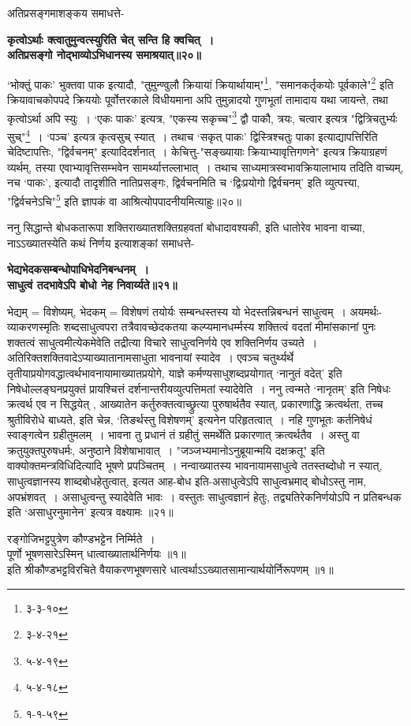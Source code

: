 {{ अतिप्रसङ्गमाशङ्कय समाधत्ते-
\begin{center}
{\bfseries कृत्वोऽर्थाः क्त्वातुमुन्वत्स्युरिति चेत् सन्ति हि क्वचित्~।\\ अतिप्रसङ्गो नोद्भाव्योऽभिधानस्य समाश्रयात्॥२०॥}
\end{center}
 `भोक्तुं पाकः' भुक्तवा पाक इत्यादौ, "तुमुन्ण्वुलौ क्रियायां क्रियार्थायाम्"\footnote{३-३-१०}, "समानकर्तृकयोः पूर्वकाले"\footnote{३-४-२१} इति क्रियावाचकोपपदे क्रिययोः पूर्वोत्तरकाले विधीयमाना अपि तुमुन्नादयो गुणभूतां तामादाय यथा जायन्ते, तथा कृत्वोऽर्था अपि स्युः~।
`एकः पाकः' इत्यत्र, "एकस्य सकृच्च"\footnote{५-४-१९} द्वौ पाकौ, त्रयः, चत्वार इत्यत्र "द्वित्रिचतुर्भ्यः सुच्"\footnote{५-४-१८}~।
`पञ्च' इत्यत्र कृत्वसुच् स्यात्~।
तथाच `सकृत् पाकः' द्विस्त्रिश्चतुः पाका इत्याद्यापत्तिरिति चेदिष्टापत्तिः, "द्विर्वचनम्" इत्यादिदर्शनात्~।
 केचित्तु-"सङ्ख्यायाः क्रियाभ्यावृत्तिगणने" इत्यत्र क्रियाग्रहणं व्यर्थम्, तस्या एवाभ्यावृत्तिसम्भवेन सामर्थ्यात्तल्लाभात्~।
तथाच साध्यमात्रस्वभावक्रियालाभाय तदिति वाच्यम्, नच `पाकः', इत्यादौ तादृशीति नातिप्रसङ्गः, द्विर्वचनमिति च `द्विःप्रयोगो द्विर्वचनम्' इति व्युत्पत्त्या, "द्विर्वचनेऽचि"\footnote{१-१-५९} इति ज्ञापकं वा आश्रित्योपपादनीयमित्याहुः॥२०॥\par
 ननु सिद्धान्ते बोधकतारूपा शक्तिराख्यातशक्तिग्रहवतां बोधादावश्यकी, इति धातोरेव भावना वाच्या, नाऽऽख्यातस्येति कथं निर्णय इत्याशङ्कां समाधत्ते-
\begin{center}{\bfseries भेद्यभेदकसम्बन्धोपाधिभेदनिबन्धनम्~।\\
 साधुत्वं तदभावेऽपि बोधो नेह निवार्य्यते॥२१॥}
\end{center} 
 भेद्यम् = विशेष्यम्, भेदकम् = विशेषणं तयोर्यः सम्बन्धस्तस्य यो भेदस्तन्निबन्धनं साधुत्वम्~।
अयमर्थः- व्याकरणस्मृतिः शब्दसाधुत्वपरा तत्रैवावच्छेदकतया कल्प्यमानधर्म्मस्य शक्तित्वं वदतां मीमांसकानां पुनः शक्तत्वं साधुत्वमीत्येकमेवेति तद्रीत्या विचारे साधुत्वनिर्णये एव शक्तिनिर्णय उच्यते~।
 अतिरिक्तशक्तिवादेऽप्याख्यातानामसाधुता भावनायां स्यादेव~।
एवञ्च चतुर्थ्यर्थे तृतीयाप्रयोगवद्धात्वर्थभावनायामाख्यातप्रयोगे, याज्ञे कर्मण्यसाधुशब्दप्रयोगात् `नानुतं वदेत्' इति निषेधोल्लङ्घनप्रयुक्तं प्रायश्चित्तं दर्शनान्तरीयव्युत्पत्तिमतां स्यादेवेति~।
 ननु त्वन्मते `नानृतम्' इति निषेधः क्रत्वर्थ एव न सिद्धयेत् , आख्यातेन कर्तुरुक्तत्वाच्छ्रुत्या पुरुषार्थतैव स्यात्, प्रकारणाद्धि क्रत्वर्थता, तच्च श्रुतीविरोधे बाध्यते, इति चेन्न, `तिङर्थस्तु विशेषणम्' इत्यनेन परिहृतत्वात्~।
नहि गुणभूतः कर्तनिषेधं स्वाङ्गत्वेन ग्रहीतुमलम्~।
भावना तु प्रधानं तं ग्रहीतुं समर्थेति प्रकारणात् क्रत्वर्थतैव~।
अस्तु वा क्रतुयुक्तपुरुषधर्मः, अनुष्ठाने विशेषाभावात्~।
"जञ्जभ्यमानोऽनुब्रूयान्मयि दक्षक्रतू" इति वाक्योक्तमन्त्रविधिदित्यादि भूषणे प्रपञ्चितम्~।
 नन्वाख्यातस्य भावनायामसाधुत्वे ततस्तब्दोधो न स्यात्, साधुत्वज्ञानस्य शाब्दबोधहेतुत्वात्, इत्यत आह-बोध इति-असाधुत्वेऽपि साधुत्वभ्रमाद् बोधोऽस्तु नाम, अपभ्रंशवत्~।
असाधुत्वन्तु स्यादेवेति भावः~।
 वस्तुतः साधुत्वज्ञानं हेतुः, तद्व्यतिरेकनिर्णयोऽपि न प्रतिबन्धक इति `असाधुरनुमानेन' इत्यत्र वक्ष्यामः ॥२१॥
\begin{center} रङ्गोजिभट्टपुत्रेण कौण्डभट्टेन निर्म्मिते~।\\ पूर्णो भूषणसारेऽस्मिन् धात्वाख्यातार्थनिर्णयः ॥१॥\\
 इति श्रीकौण्डभट्टविरचिते वैयाकरणभूषणसारे धात्वर्थाऽऽख्यातसामान्यार्थयोर्निरूपणम् ॥१॥ \end{center}

}}

